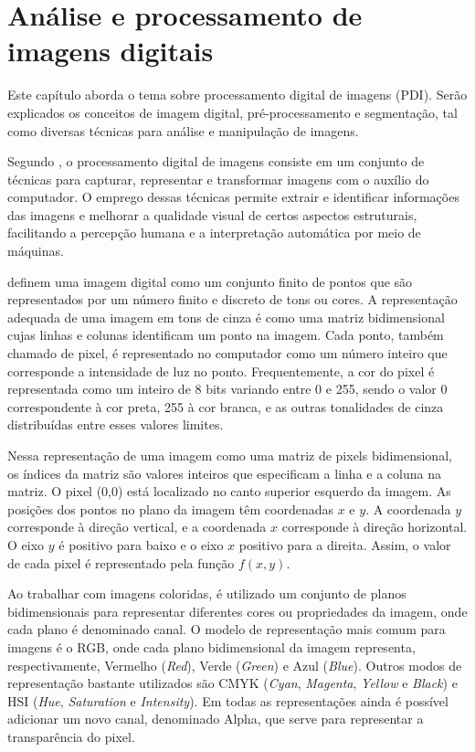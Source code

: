 \documentclass[12pt,oneside,a4paper,english,french,spanish,brazil,]{abntex2}
\begin{document}
\chapter{Análise e processamento de imagens digitais}
\label{chp:PDI}

Este capítulo aborda o tema sobre processamento digital de imagens (PDI). Serão explicados os conceitos de imagem digital, pré-processamento e segmentação, tal como diversas técnicas para análise e manipulação de imagens.

Segundo \citet{pedrini:2008}, o processamento digital de imagens consiste em um conjunto de técnicas para capturar, representar e transformar imagens com o auxílio do computador. O emprego dessas técnicas permite extrair e identificar informações das imagens e melhorar a qualidade visual de certos aspectos estruturais, facilitando a percepção humana e a interpretação automática por meio de máquinas. 

\citet{conci:2003} definem uma imagem digital como um conjunto finito de pontos que são representados por um número finito e discreto de tons ou cores. A representação adequada de uma imagem em tons de cinza é como uma matriz bidimensional cujas linhas e colunas identificam um ponto na imagem. Cada ponto, também chamado de pixel, é representado no computador como um número inteiro que corresponde a intensidade de luz no ponto. Frequentemente, a cor do pixel é representada como um inteiro de 8 bits variando entre 0 e 255, sendo o valor 0 correspondente à cor preta, 255 à cor branca, e as outras tonalidades de cinza distribuídas entre esses valores limites.

Nessa representação de uma imagem como uma matriz de pixels bidimensional, os índices da matriz são valores inteiros que especificam a linha e a coluna na matriz. O pixel (0,0) está localizado no canto superior esquerdo da imagem. As posições dos pontos no plano da imagem têm coordenadas \(x\) e \(y\). A coordenada \(y\) corresponde à direção vertical, e a coordenada \(x\) corresponde à direção horizontal. O eixo \(y\) é positivo para baixo e o eixo \(x\) positivo para a direita. Assim, o valor de cada pixel é representado pela função \(f(x,y)\).

Ao trabalhar com imagens coloridas, é utilizado um conjunto de planos bidimensionais para representar diferentes cores ou propriedades da imagem, onde cada plano é denominado canal. O modelo de representação mais comum para imagens é o RGB, onde cada plano bidimensional da imagem representa, respectivamente, Vermelho (\textit{Red}), Verde (\textit{Green}) e Azul (\textit{Blue}). Outros modos de representação bastante utilizados são CMYK (\textit{Cyan}, \textit{Magenta}, \textit{Yellow} e \textit{Black}) e HSI (\textit{Hue}, \textit{Saturation} e \textit{Intensity}). Em todas as representações ainda é possível adicionar um novo canal, denominado Alpha, que serve para representar a transparência do pixel.
\end{document}
